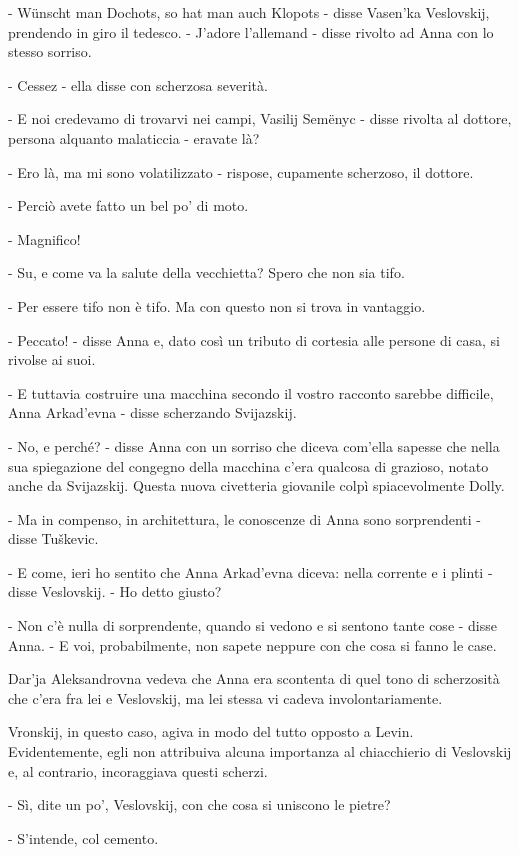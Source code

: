 - Wünscht man Dochots, so hat man auch Klopots - disse Vasen'ka Veslovskij, prendendo in giro il tedesco. - J'adore l'allemand - disse rivolto ad Anna con lo stesso sorriso. 

- Cessez - ella disse con scherzosa severità. 

- E noi credevamo di trovarvi nei campi, Vasilij Semënyc - disse rivolta al dottore, persona alquanto malaticcia - eravate là? 

- Ero là, ma mi sono volatilizzato - rispose, cupamente scherzoso, il dottore. 

- Perciò avete fatto un bel po' di moto. 

- Magnifico! 

- Su, e come va la salute della vecchietta? Spero che non sia tifo. 

- Per essere tifo non è tifo. Ma con questo non si trova in vantaggio. 

- Peccato! - disse Anna e, dato così un tributo di cortesia alle persone di casa, si rivolse ai suoi. 

- E tuttavia costruire una macchina secondo il vostro racconto sarebbe difficile, Anna Arkad'evna - disse scherzando Svijazskij. 

- No, e perché? - disse Anna con un sorriso che diceva com'ella sapesse che nella sua spiegazione del congegno della macchina c'era qualcosa di grazioso, notato anche da Svijazskij. Questa nuova civetteria giovanile colpì spiacevolmente Dolly. 

- Ma in compenso, in architettura, le conoscenze di Anna sono sorprendenti - disse Tuškevic. 

- E come, ieri ho sentito che Anna Arkad'evna diceva: nella corrente e i plinti - disse Veslovskij. - Ho detto giusto? 

- Non c'è nulla di sorprendente, quando si vedono e si sentono tante cose - disse Anna. - E voi, probabilmente, non sapete neppure con che cosa si fanno le case. 

Dar'ja Aleksandrovna vedeva che Anna era scontenta di quel tono di scherzosità che c'era fra lei e Veslovskij, ma lei stessa vi cadeva involontariamente. 

Vronskij, in questo caso, agiva in modo del tutto opposto a Levin. Evidentemente, egli non attribuiva alcuna importanza al chiacchierio di Veslovskij e, al contrario, incoraggiava questi scherzi. 

- Sì, dite un po', Veslovskij, con che cosa si uniscono le pietre? 

- S'intende, col cemento. 

